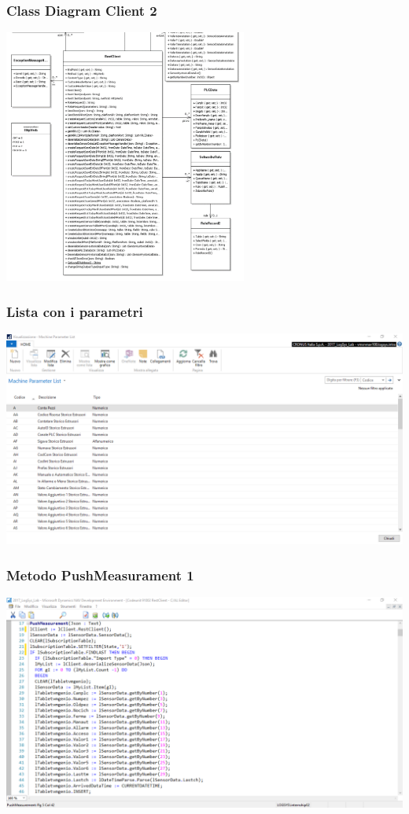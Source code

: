 \documentclass{beamer}
\begin{document}
\begin{frame}
	\frametitle{Class Diagram Client 2}
	\includegraphics[width=0.6\textwidth]{images/ClassDiagramParte2.png}
\end{frame}

\begin{frame}
\frametitle{Lista con i parametri}
\includegraphics[width=1\textwidth]{images/MachineParameter.png}
\end{frame}

\begin{frame}
\frametitle{Metodo PushMeasurament 1}
\includegraphics[width=1\textwidth]{images/NAVPushMeasuraments1.png}
\end{frame}
\end{document}
